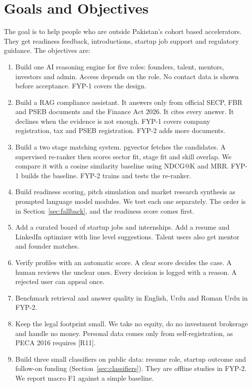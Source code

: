 \documentclass{FastFyp}
\newcommand{\src}[1]{[#1]}
\begin{document}
\section{Goals and Objectives}\label{sec:goals}
The goal is to help people who are outside Pakistan's cohort based accelerators. They get readiness feedback, introductions, startup job support and regulatory guidance. The objectives are:
\begin{enumerate}
\item Build one AI reasoning engine for five roles: founders, talent, mentors, investors and admin. Access depends on the role. No contact data is shown before acceptance. FYP-1 covers the design.
\item Build a RAG compliance assistant. It answers only from official SECP, FBR and PSEB documents and the Finance Act 2026. It cites every answer. It declines when the evidence is not enough. FYP-1 covers company registration, tax and PSEB registration. FYP-2 adds more documents.
\item Build a two stage matching system. pgvector fetches the candidates. A supervised re-ranker then scores sector fit, stage fit and skill overlap. We compare it with a cosine similarity baseline using NDCG@K and MRR. FYP-1 builds the baseline. FYP-2 trains and tests the re-ranker.
\item Build readiness scoring, pitch simulation and market research synthesis as prompted language model modules. We test each one separately. The order is in Section~\ref{sec:fallback}, and the readiness score comes first.
\item Add a curated board of startup jobs and internships. Add a resume and LinkedIn optimizer with line level suggestions. Talent users also get mentor and founder matches.
\item Verify profiles with an automatic score. A clear score decides the case. A human reviews the unclear ones. Every decision is logged with a reason. A rejected user can appeal once.
\item Benchmark retrieval and answer quality in English, Urdu and Roman Urdu in FYP-2.
\item Keep the legal footprint small. We take no equity, do no investment brokerage and handle no money. Personal data comes only from self-registration, as PECA 2016 requires \src{R11}.
\item Build three small classifiers on public data: resume role, startup outcome and follow-on funding (Section~\ref{sec:classifiers}). They are offline studies in FYP-2. We report macro F1 against a simple baseline.
\end{enumerate}
\end{document}
